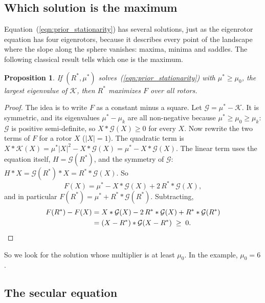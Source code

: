 \documentclass{birkjour}
\newtheorem{prop}[thm]{Proposition}
\theoremstyle{definition}
\theoremstyle{remark}
\numberwithin{equation}{section}
\newcommand{\K}{\mathcal{K}}
\newcommand{\Gop}{\mathcal{G}}
\begin{document}
\subsection{Which solution is the maximum}

Equation~(\ref{eqn:prior_stationarity}) has several solutions, just as the eigenrotor equation has four eigenrotors, because it describes every point of the landscape where the slope along the sphere vanishes: maxima, minima and saddles. The following classical result \cite{Gander1989, MoreSorensen1983} tells which one is the maximum.
\begin{prop}
\label{prop:prior_maximum}
If $(R^*, \mu^*)$ solves~(\ref{eqn:prior_stationarity}) with $\mu^* \geq \mu_0$, the largest eigenvalue of $\K$, then $R^*$ maximizes $F$ over all rotors.
\end{prop}
\begin{proof}
The idea is to write $F$ as a constant minus a square. Let $\Gop = \mu^* - \K$. It is symmetric, and its eigenvalues $\mu^* - \mu_k$ are all non-negative because $\mu^* \geq \mu_0 \geq \mu_k$: $\Gop$ is positive semi-definite, so $X * \Gop(X) \geq 0$ for every $X$. Now rewrite the two terms of $F$ for a rotor $X$ ($|X| = 1$). The quadratic term is $X * \K(X) = \mu^* |X|^2 - X * \Gop(X) = \mu^* - X * \Gop(X)$. The linear term uses the equation itself, $H = \Gop(R^*)$, and the symmetry of $\Gop$: $H * X = \Gop(R^*) * X = R^* * \Gop(X)$. So
\begin{equation*}
F(X) = \mu^* - X * \Gop(X) + 2\, R^* * \Gop(X),
\end{equation*}
and in particular $F(R^*) = \mu^* + R^* * \Gop(R^*)$. Subtracting,
\begin{align*}
F(R^*) - F(X) &= X * \Gop(X) - 2\, R^* * \Gop(X) + R^* * \Gop(R^*) \\
&= (X - R^*) * \Gop(X - R^*) \;\geq\; 0. \qedhere
\end{align*}
\end{proof}
So we look for the solution whose multiplier is at least $\mu_0$. In the example, $\mu_0 = 6$.

\subsection{The secular equation}
\end{document}
